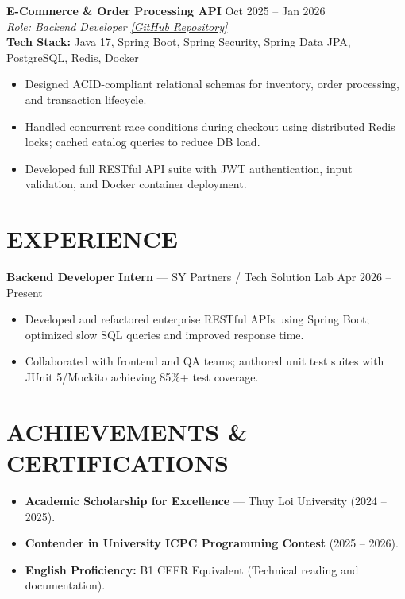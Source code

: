 ﻿\documentclass[10pt,a4paper]{article}
\begin{document}
\vspace{3pt}

\noindent
\textbf{E-Commerce \& Order Processing API} \hfill Oct 2025 -- Jan 2026 \\
\textit{Role: Backend Developer} \hfill \href{https://github.com/ng-doanh/ecommerce-platform}{\textit{[GitHub Repository]}} \\
\textbf{Tech Stack:} Java 17, Spring Boot, Spring Security, Spring Data JPA, PostgreSQL, Redis, Docker
\begin{itemize}
    \item Designed ACID-compliant relational schemas for inventory, order processing, and transaction lifecycle.
    \item Handled concurrent race conditions during checkout using distributed Redis locks; cached catalog queries to reduce DB load.
    \item Developed full RESTful API suite with JWT authentication, input validation, and Docker container deployment.
\end{itemize}

\section*{EXPERIENCE}
\noindent
\textbf{Backend Developer Intern} --- SY Partners / Tech Solution Lab \hfill Apr 2026 -- Present
\begin{itemize}
    \item Developed and refactored enterprise RESTful APIs using Spring Boot; optimized slow SQL queries and improved response time.
    \item Collaborated with frontend and QA teams; authored unit test suites with JUnit 5/Mockito achieving 85\%+ test coverage.
\end{itemize}

\section*{ACHIEVEMENTS \& CERTIFICATIONS}
\begin{itemize}
    \item \textbf{Academic Scholarship for Excellence} --- Thuy Loi University (2024 -- 2025).
    \item \textbf{Contender in University ICPC Programming Contest} (2025 -- 2026).
    \item \textbf{English Proficiency:} B1 CEFR Equivalent (Technical reading and documentation).
\end{itemize}
\end{document}
